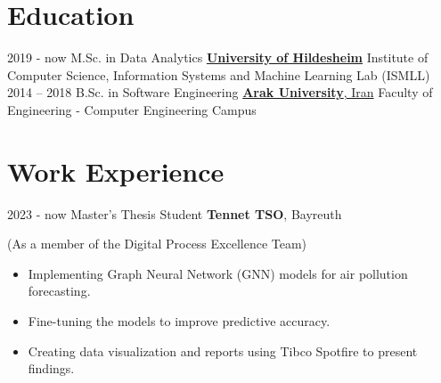 \documentclass[a4paper]{mctemplate} %
\begin{document}

\begin{main}

\section{Education}

\begin{experiencelist} 
	\experienceitem
    	{2019 - now }
        {M.Sc. in Data Analytics}
        {\href{https://www.uni-hildesheim.de/}{\textbf{University of Hildesheim}}}
        {Institute of Computer Science, Information Systems and Machine Learning Lab (ISMLL) \\
         }
	\experienceitem
    	{2014 – 2018}
        {B.Sc. in Software Engineering}
        {\href{http://araku.ac.ir/en/1}{\textbf{Arak University}, Iran}}
        {Faculty of Engineering - Computer Engineering Campus}
    
\end{experiencelist}


\section{Work Experience}

\begin{experiencelist}
    \experienceitem
        {2023 - now}
        {Master's Thesis Student}
        {\textbf{Tennet TSO}, Bayreuth}
        {(As a member of the Digital Process Excellence Team)
        \begin{itemize}
              \item Implementing Graph Neural Network (GNN) models for air pollution forecasting.
          \end{itemize}
          
          \begin{itemize}
              \item  Fine-tuning the models to improve predictive accuracy.
          \end{itemize}    
         \begin{itemize}
              \item Creating data visualization and reports using Tibco Spotfire to present findings.
        \end{itemize}
          
}
\end{experiencelist}
\end{main}
\end{document}
